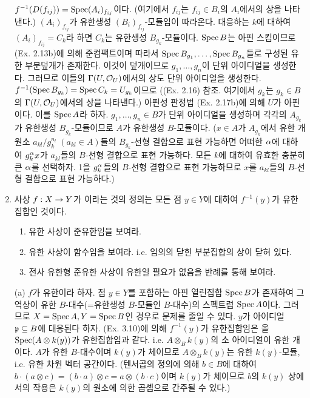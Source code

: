 \begin{enumerate}[label=\tb{3.\arabic*.},itemindent=0mm,itemsep=4mm]
	$f^{-1}(D(f_{ij}))=\operatorname{Spec}(A_i)_{f_{ij}}$이다. (여기에서 $f_{ij}$는 $f_{ij}\in B_i$의 $A_i$에서의 상을 나타낸다.)
	$(A_i)_{f_{ij}}$가 유한생성 $(B_i)_{f_{ij}}$-모듈임이 따라온다.
	대응하는 $k$에 대하여 $(A_i)_{f_{ij}}=C_k$라 하면 $C_k$는 유한생성 $B_{g_k}$-모듈이다.
	$\operatorname{Spec} B$는 아핀 스킴이므로 (Ex. 2.13b)에 의해 준컴팩트이며 따라서 $\operatorname{Spec} B_{g_1},\ldots,\operatorname{Spec} B_{g_n}$들로 구성된
	유한 부분덮개가 존재한다. 이것이 덮개이므로 $g_1,\ldots,g_n$이 단위 아이디얼을 생성한다.
	그러므로 이들의 $\Gamma(U,\mathcal{O}_U)$에서의 상도 단위 아이디얼을 생성한다. $f^{-1}(\operatorname{Spec} B_{g_k})=\operatorname{Spec} C_k=U_{g_k}$이므로
	((Ex. 2.16) 참조. 여기에서 $g_k$는 $g_k\in B$의 $\Gamma(U,\mathcal{O}_U)$에서의 상을 나타낸다.)
	아핀성 판정법 (Ex. 2.17b)에 의해 $U$가 아핀이다. 이를 $\operatorname{Spec} A$라 하자.
	$g_1,\ldots,g_n\in B$가 단위 아이디얼을 생성하며 각각의 $A_{g_k}$가 유한생성 $B_{g_k}$-모듈이므로 $A$가 유한생성 $B$-모듈이다.
	($x\in A$가 $A_{g_k}$에서 유한 개 원소 $a_{kl}/g_k^{n_l}\;(a_{kl}\in A)$들의 $B_{g_k}$-선형 결합으로 표현 가능하면
	어떠한 $\alpha$에 대하여 $g_k^\alpha x$가 $a_{kl}$들의 $B$-선형 결합으로 표현 가능하다.
	모든 $k$에 대하여 유효한 충분히 큰 $\alpha$를 선택하자.
	1을 $g_k^\alpha$들의 $B$-선형 결합으로 표현 가능하므로 $x$를 $a_{kl}$들의 $B$-선형 결합으로 표현 가능하다.)
	\item 사상 $f:X\rightarrow Y$가 이라는 것의 정의는 모든 점 $y\in Y$에 대하여 $f^{-1}(y)$가 유한집합인 것이다.
	\begin{enumerate}[label=(\alph*)]
	\item 유한 사상이 준유한임을 보여라.
	\item 유한 사상이  함수임을 보여라. i.e. 임의의 닫힌 부분집합의 상이 닫혀 있다.
	\item 전사 유한형 준유한 사상이 유한일 필요가 없음을 반례를 통해 보여라.
	\end{enumerate}
	\sol (a) $f$가 유한이라 하자. 점 $y\in Y$를 포함하는 아핀 열린집합 $\operatorname{Spec} B$가 존재하여
	그 역상이 유한 $B$-대수(=유한생성 $B$-모듈인 $B$-대수)의 스펙트럼 $\operatorname{Spec} A$이다.
	그러므로 $X=\operatorname{Spec} A,Y=\operatorname{Spec} B$인 경우로 문제를 줄일 수 있다.
	$y$가 아이디얼 $\mathfrak{p}\subseteq B$에 대응된다 하자.
	(Ex. 3.10)에 의해 $f^{-1}(y)$가 유한집합임은 올 $\operatorname{Spec}(A\otimes k(y))$가 유한집합임과 같다.
	i.e. $A\otimes_Bk(y)$의 소 아이디얼이 유한 개이다.
	$A$가 유한 $B$-대수이며 $k(y)$가 체이므로 $A\otimes_Bk(y)$는 유한 $k(y)$-모듈, i.e. 유한 차원 벡터 공간이다.
	(텐서곱의 정의에 의해 $b\in B$에 대하여 $b\cdot(a\otimes c)=(b\cdot a)\otimes c=a\otimes(b\cdot c)$이며 $k(y)$가 체이므로
	$b$의 $k(y)$ 상에서의 작용은 $k(y)$의 원소에 의한 곱셈으로 간주될 수 있다.)

\end{enumerate}
